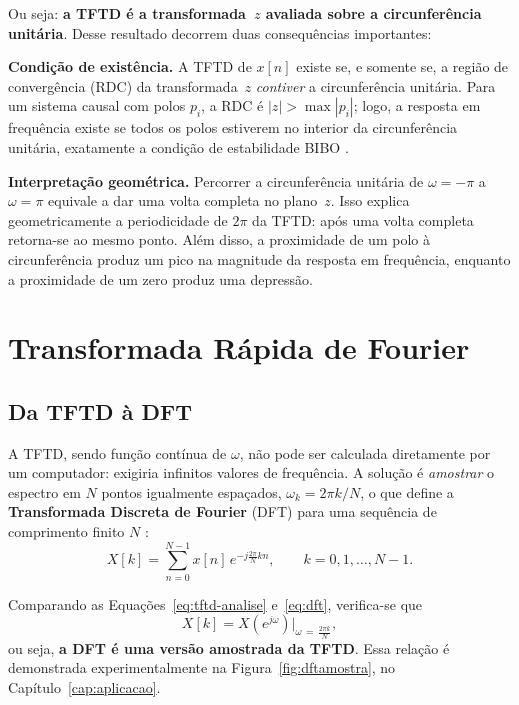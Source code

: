 \documentclass[
    12pt,
    openright,
    oneside,
    a4paper,
    chapter=TITLE,
    section=TITLE,
    brazil
]{abntex2}
\begin{document}
Ou seja: \textbf{a TFTD é a transformada~$z$ avaliada sobre a circunferência unitária}.
Desse resultado decorrem duas consequências importantes:

\begin{alineas}
\item \textbf{Condição de existência.} A TFTD de $x[n]$ existe se, e somente se, a
região de convergência (RDC) da transformada~$z$ \emph{contiver} a circunferência
unitária. Para um sistema causal com polos $p_i$, a RDC é $|z| > \max|p_i|$; logo, a
resposta em frequência existe se todos os polos estiverem no interior da circunferência
unitária, exatamente a condição de estabilidade BIBO \cite{oppenheim2013}.

\item \textbf{Interpretação geométrica.} Percorrer a circunferência unitária de
$\omega = -\pi$ a $\omega = \pi$ equivale a dar uma volta completa no plano~$z$. Isso
explica geometricamente a periodicidade de $2\pi$ da TFTD: após uma volta completa
retorna-se ao mesmo ponto. Além disso, a proximidade de um polo à circunferência produz
um pico na magnitude da resposta em frequência, enquanto a proximidade de um zero
produz uma depressão.
\end{alineas}

\vspace{1cm}

\chapter{Transformada Rápida de Fourier}
\label{cap:fft}

\section{Da TFTD à DFT}

A TFTD, sendo função contínua de $\omega$, não pode ser calculada diretamente por um
computador: exigiria infinitos valores de frequência. A solução é \emph{amostrar} o
espectro em $N$ pontos igualmente espaçados, $\omega_k = 2\pi k/N$, o que define a
\textbf{Transformada Discreta de Fourier} (DFT) para uma sequência de comprimento
finito $N$ \cite{ingle2010}:
\begin{equation}
    X[k] = \sum_{n=0}^{N-1} x[n]\,e^{-j\frac{2\pi}{N}kn},
    \qquad k = 0,1,\dots,N-1.
    \label{eq:dft}
\end{equation}

Comparando as Equações~\eqref{eq:tftd-analise} e~\eqref{eq:dft}, verifica-se que
\begin{equation}
    X[k] = X(e^{j\omega})\Big|_{\omega\,=\,\frac{2\pi k}{N}},
\end{equation}
ou seja, \textbf{a DFT é uma versão amostrada da TFTD}. Essa relação é demonstrada
experimentalmente na Figura~\ref{fig:dftamostra}, no Capítulo~\ref{cap:aplicacao}.
\end{document}
